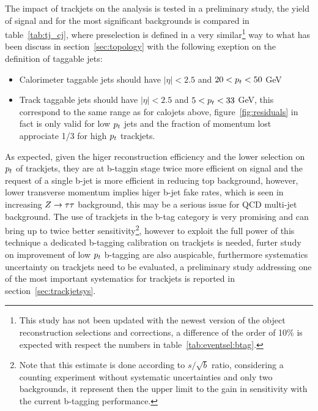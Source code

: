 The impact of trackjets on the analysis is tested in a preliminary study, the yield of 
signal and for the most significant backgrounds is compared in table~\ref{tab:tj_cj},
where preselection is defined in a very similar\footnote{This study has not been updated 
with the newest version of the object reconstruction selections and corrections, a difference of the order of 10\%
is expected with respect the numbers in table~\ref{tab:eventsel:btag}.} 
way to what has been discuss in section~\ref{sec:topology} with the following exeption 
on the definition of taggable jets:
\begin{itemize}
\item Calorimeter taggable jets should have $|\eta| < 2.5$ and $20 < p_{t} < 50$ GeV
\item Track taggable jets should have $|\eta| < 2.5$ and $5 < p_{t} < 33$ GeV, this correspond to the same
  	range as for calojets above, figure~\ref{fig:residuals} in fact is only valid for low $p_{t}$ jets
	and the fraction of momentum lost approciate 1/3 for high $p_{t}$ trackjets. 
\end{itemize} 
As expected, given the higer reconstruction efficiency and the lower selection on $p_{t}$ of trackjets, they are
at b-taggin stage twice more efficient on signal and the request of a single b-jet is more efficient in reducing top background,
however, lower transverse momentum implies higer b-jet fake rates, which is seen in increasing $Z\rightarrow \tau\tau$ background, 
this may be a serious issue for QCD multi-jet background. The use of trackjets in the b-tag category is very promising
and can bring up to twice better sensitivity\footnote{Note that this estimate is done according to $s/\sqrt{b}$ ratio,
considering a counting experiment without systematic uncertainties and only two backgrounds, it represent then the upper limit 
to the gain in sensitivity with the current b-tagging performance.}, 
however to exploit the full power of this technique a dedicated b-tagging calibration on
trackjets is needed, furter study on improvement of low $p_{t}$ b-tagging are also auspicable, furthermore systematics uncertainty
on trackjets need to be evaluated, a preliminary study addressing one of the most important systematics for trackjets is 
reported in section~\ref{sec:trackjetsys}.
 
